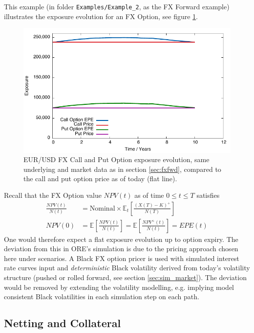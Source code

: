 \documentclass[12pt, a4paper]{article}
\newcommand\E{\ensuremath{\mathbb{E}}}
\newcommand{\EPE}{\mathit{EPE}}
\begin{document}
This example (in folder {\tt Examples/Example\_2}, as the FX Forward example) illustrates the exposure evolution for an FX Option, see figure \ref{fig_7}. 
\begin{figure}[hbt]
\begin{center}
\includegraphics[scale=1.0]{example_fxoption_fwdvariance_corrected.pdf}
\end{center}
\caption{EUR/USD FX Call and Put Option exposure evolution, same underlying and market data as in section \ref{sec:fxfwd}, compared to the call and put option price as of today (flat line).}
\label{fig_7}
\end{figure}
Recall that the FX Option value $NPV(t)$ as of time $0 \leq t \leq T$ satisfies
\begin{align*}
\frac{NPV(t)}{N(t)} &= \mbox{Nominal}\times\E_t\left[\frac{(X(T) - K)^+}{N(T)}\right]\\
NPV(0) &= \E\left[\frac{NPV(t)}{N(t)}\right] = \E\left[\frac{NPV^+(t)}{N(t)} \right]= \EPE(t) 
\end{align*}
One would therefore expect a flat exposure evolution up to option expiry. The deviation from this in ORE's simulation is due to the pricing approach chosen here under scenarios. A Black FX option pricer is used with simulated interest rate curves input and {\em deterministic} Black volatility derived from today's volatility structure (pushed or rolled forward, see section \ref{sec:sim_market}). The deviation would be removed by extending the volatility modelling, e.g. implying model consistent Black volatilities in each simulation step on each path.
 
\subsection{Netting and Collateral}
\end{document}

